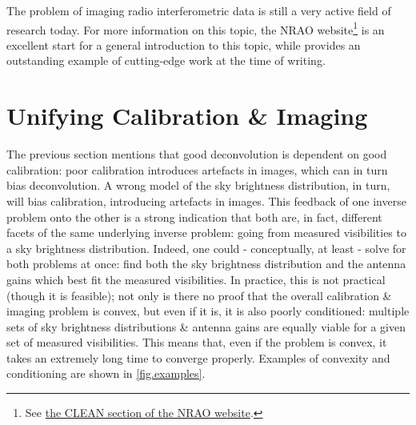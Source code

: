 \pg
The problem of imaging radio interferometric data is still a very active field of research today. For more information on this topic, the NRAO website\footnote{See \href{https://www.cv.nrao.edu/~abridle/deconvol/node8.html\#SECTION00051000000000000000}{the CLEAN section of the NRAO website}.} is an excellent start for a general introduction to this topic, while \citet{2017arXiv171202078T} provides an outstanding example of cutting-edge work at the time of writing.

\section{Unifying Calibration \& Imaging}\label{sec.CalibImagery}

\pg
The previous section mentions that good deconvolution is dependent on good calibration: poor calibration introduces artefacts in images, which can in turn bias deconvolution. A wrong model of the sky brightness distribution, in turn, will bias calibration, introducing artefacts in images. This feedback of one inverse problem onto the other is a strong indication that both are, in fact, different facets of the same underlying inverse problem: going from measured visibilities to a sky brightness distribution. Indeed, one could - conceptually, at least - solve for both problems at once: find both the sky brightness distribution and the antenna gains which best fit the measured visibilities. In practice, this is not practical (though it is feasible); not only is there no proof that the overall calibration \& imaging problem is convex, but even if it is, it is also poorly conditioned: multiple sets of sky brightness distributions \& antenna gains are equally viable for a given set of measured visibilities. This means that, even if the problem is convex, it takes an extremely long time to converge properly. Examples of convexity and conditioning are shown in \cref{fig.examples}.

